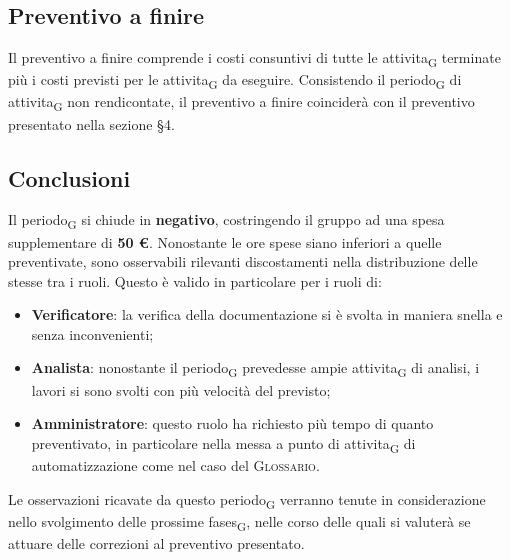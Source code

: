 \subsection{Preventivo a finire}
Il preventivo a finire comprende i costi consuntivi di tutte le \gls{attivita}\textsubscript{G} terminate più i costi previsti per le \gls{attivita}\textsubscript{G} da eseguire. Consistendo il \gls{periodo}\textsubscript{G} di \gls{attivita}\textsubscript{G} non rendicontate, il preventivo a finire coinciderà con il preventivo presentato nella sezione \S 4.



\subsection{Conclusioni}

Il \gls{periodo}\textsubscript{G} si chiude in \textbf{negativo}, costringendo il gruppo ad una spesa supplementare di \textbf{50 \euro{}}. Nonostante le ore spese siano inferiori a quelle preventivate, sono osservabili rilevanti discostamenti nella distribuzione delle stesse tra i ruoli. Questo è valido in particolare per i ruoli di:
\begin{itemize}
	\item \textbf{Verificatore}: la verifica della documentazione si è svolta in maniera snella e senza inconvenienti;
	\item \textbf{Analista}: nonostante il \gls{periodo}\textsubscript{G} prevedesse ampie \gls{attivita}\textsubscript{G} di analisi, i lavori si sono svolti con più velocità del previsto;
	\item \textbf{Amministratore}: questo ruolo ha richiesto più tempo di quanto preventivato, in particolare nella messa a punto di \gls{attivita}\textsubscript{G} di automatizzazione come nel caso del \textsc{Glossario}.
\end{itemize}
Le osservazioni ricavate da questo \gls{periodo}\textsubscript{G} verranno tenute in considerazione nello svolgimento delle prossime \glspl{fase}\textsubscript{G}, nelle corso delle quali si valuterà se attuare delle correzioni al preventivo presentato.
